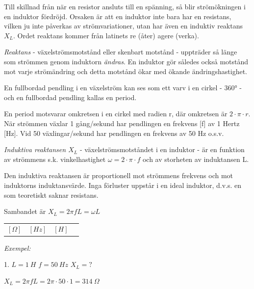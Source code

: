 Till skillnad från när en resistor ansluts till en spänning, så blir
strömökningen i en induktor fördröjd. Orsaken är att en induktor inte bara har
en resistans, vilken ju inte påverkas av strömvariationer, utan har även en
induktiv reaktans \(X_L\). Ordet reaktans kommer från latinets re (åter) agere
(verka).

\emph{Reaktans} - växelströmsmotstånd eller skenbart motstånd - uppträder så
länge som strömmen genom induktorn \emph{ändras}. En induktor gör således också
motstånd mot varje strömändring och detta motstånd ökar med ökande
ändringshastighet.

En fullbordad pendling i en växelström kan ses som ett varv i en cirkel - 360° -
och en fullbordad pendling kallas en period.

En period motsvarar omkretsen i en cirkel med radien r, där omkretsen är
\(2 \cdot π \cdot r\). När strömmen växlar 1 gång/sekund har
pendlingen en frekvens [f] av 1 Hertz [Hz]. Vid 50 växlingar/sekund har
pendlingen en frekvens av 50 Hz o.s.v.

\emph{Induktiva reaktansen \(X_L\)} - växelströmsmotståndet i en induktor - är
en funktion av strömmens s.k. vinkelhastighet \(\omega = 2 \cdot π \cdot f\) och
av storheten av induktansen L.

Den induktiva reaktansen är proportionell mot strömmens frekvens och mot
induktorns induktansvärde. Inga förluster uppstår i en ideal induktor, d.v.s. en
som teoretiskt saknar resistans.

Sambandet är
\(X_L = 2πfL = \omega L\)



\begin{tabular}{llll}
 \([\Omega]\) & \([Hz]\) & \([H]\)
 \end{tabular}

\emph{Exempel:}

1. \(L = 1\ H\) \(f = 50\ Hz\) \(X_L = ?\)

\(X_L = 2πfL = 2π \cdot 50 \cdot 1 = 314\ Ω\)


